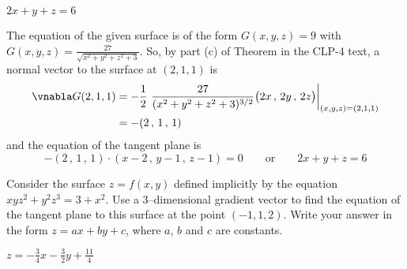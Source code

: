 \begin{answer}
$2x+y+z = 6$
\end{answer}

\begin{solution}
The equation of the given surface is of the form $G(x,y,z)=9$
with $G(x,y,z) =\frac{27}{\sqrt{x^2+y^2+z^2+3}}$. So,
by part (c) of Theorem  
in the CLP-4 text, a normal
vector to the surface at $(2,1,1)$ is
\begin{align*}
\vnabla G(2,1,1)
  &=-\frac{1}{2}\ \frac{27}{(x^2+y^2+z^2+3)^{3/2}}\big(2x\,,\,2y\,,\,2z\big)
                                          \bigg|_{(x,y,z)=(2,1,1)} \\
  &=-( 2\,,\,1\,,\,1)
\end{align*}
and the equation of the tangent plane is
\begin{equation*}
-( 2\,,\,1\,,\,1)\cdot ( x-2\,,\,y-1\,,\,z-1)=0\qquad\text{or}\qquad
2x+y+z = 6
\end{equation*}
\end{solution}

\begin{question}[M200 2005D] %
Consider the surface $z = f(x,y)$ defined implicitly by the equation 
$xyz^2 + y^2 z^3 = 3 + x^2$. Use a 3--dimensional gradient vector 
to find the equation of the tangent plane to this surface at the point
$(-1, 1, 2)$. Write your answer in the form $z = ax + by + c$, where 
$a$, $b$ and $c$ are constants.
\end{question}

%

\begin{answer}
$z = -\frac{3}{4} x- \frac{3}{2} y + \frac{11}{4}$
\end{answer}

